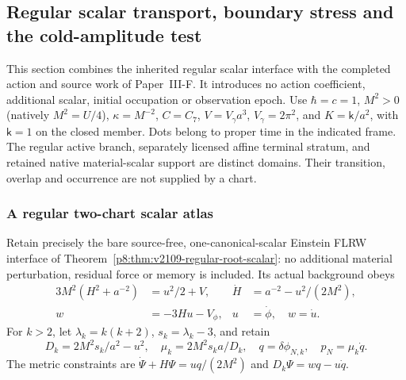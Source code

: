 \documentclass[12pt,a4paper]{article}
\begin{document}
\subsection{Regular scalar transport, boundary stress and the cold-amplitude test}
\label{p8:sec:v2203-euler-vacuum-scalar-transport}

This section combines the inherited regular scalar interface with the
completed action and source work of Paper~III-F. It introduces no action
coefficient, additional scalar, initial occupation or observation epoch.
Use $\hbar=c=1$, $M^2>0$ (natively $M^2=U/4$), $\kappa=M^{-2}$, $C=C_7$,
$V=V_\gamma a^3$, $V_\gamma=2\pi^2$, and $K=\mathsf k/a^2$, with $\mathsf k=1$
on the closed member. Dots belong to proper time in the indicated frame.
The regular active branch, separately licensed affine terminal stratum,
and retained native material-scalar support are distinct domains.
Their transition, overlap and occurrence are not supplied by a chart.

\subsubsection{A regular two-chart scalar atlas}
Retain precisely the bare source-free, one-canonical-scalar Einstein
FLRW interface of Theorem~\ref{p8:thm:v2109-regular-root-scalar}:
no additional material perturbation, residual force or memory is included.
Its actual background obeys
\[
 \begin{aligned}
 3M^2(H^2+a^{-2})&=u^2/2+V, &\dot H&=a^{-2}-u^2/(2M^2),\\
 w&=-3Hu-V_\phi, &u&=\dot\phi,\quad w=\dot u.
 \end{aligned}
\]
For $k>2$, let $\lambda_k=k(k+2)$, $s_k=\lambda_k-3$, and retain
\[
 D_k=2M^2s_k/a^2-u^2,\quad \mu_k=2M^2s_ka/D_k,\quad
 q=\delta\phi_{N,k},\quad p_N=\mu_k\dot q.
\]
The metric constraints are
$\dot\Psi+H\Psi=uq/(2M^2)$ and $D_k\Psi=wq-u\dot q$.
\end{document}
